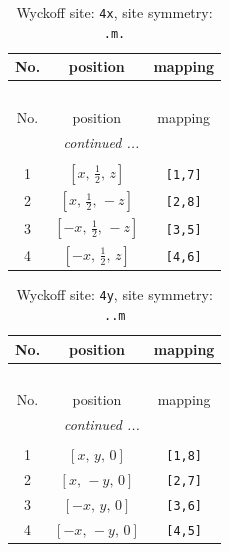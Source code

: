 \documentclass[fleqn,8pt]{jsarticle}
\begin{document}
\renewcommand{\arraystretch}{1.2}
\begin{longtable}{ccc}
\caption{Wyckoff site: {\tt 4x}, site symmetry: {\tt .m.}}
 \\
 \hline \hline
No. & position & mapping \\ \hline \endfirsthead

\multicolumn{2}{l}{\tablename\ \thetable{}} \\
 \hline \hline
No. & position & mapping \\ \hline \endhead

 \hline \hline
\multicolumn{2}{r}{\footnotesize\it continued ...} \\ \endfoot

 \hline \hline
\multicolumn{2}{r}{} \\ \endlastfoot

1 & $\left[ x,\, \frac{1}{2},\, z \right]$ & {\tt [1,7]} \\ \hline
2 & $\left[ x,\, \frac{1}{2},\, - z \right]$ & {\tt [2,8]} \\ \hline
3 & $\left[ - x,\, \frac{1}{2},\, - z \right]$ & {\tt [3,5]} \\ \hline
4 & $\left[ - x,\, \frac{1}{2},\, z \right]$ & {\tt [4,6]} \\
\end{longtable}
\renewcommand{\arraystretch}{1.2}
\begin{longtable}{ccc}
\caption{Wyckoff site: {\tt 4y}, site symmetry: {\tt ..m}}
 \\
 \hline \hline
No. & position & mapping \\ \hline \endfirsthead

\multicolumn{2}{l}{\tablename\ \thetable{}} \\
 \hline \hline
No. & position & mapping \\ \hline \endhead

 \hline \hline
\multicolumn{2}{r}{\footnotesize\it continued ...} \\ \endfoot

 \hline \hline
\multicolumn{2}{r}{} \\ \endlastfoot

1 & $\left[ x,\, y,\, 0 \right]$ & {\tt [1,8]} \\ \hline
2 & $\left[ x,\, - y,\, 0 \right]$ & {\tt [2,7]} \\ \hline
3 & $\left[ - x,\, y,\, 0 \right]$ & {\tt [3,6]} \\ \hline
4 & $\left[ - x,\, - y,\, 0 \right]$ & {\tt [4,5]} \\
\end{longtable}
\end{document}
